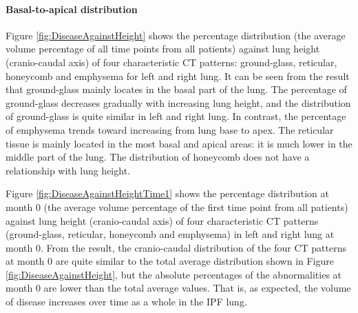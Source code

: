 \paragraph{Basal-to-apical distribution}
Figure \ref{fig:DiseaseAgainstHeight} shows the percentage distribution (the average volume percentage of all time points from all patients) against lung height (cranio-caudal axis) of four characteristic CT patterns: ground-glass, reticular, honeycomb and emphysema for left and right lung. It can be seen from the result that ground-glass mainly locates in the basal part of the lung. The percentage of ground-glass decreases gradually with increasing lung height, and the distribution of ground-glass is quite similar in left and right lung. In contrast, the percentage of emphysema trends toward increasing from lung base to apex. The reticular tissue is mainly located in the most basal and apical areas: it is much lower in the middle part of the lung. The distribution of honeycomb does not have a relationship with lung height.

Figure \ref{fig:DiseaseAgainstHeightTime1} shows the percentage distribution at month 0 (the average volume percentage of the first time point from all patients) against lung height (cranio-caudal axis) of four characteristic CT patterns (ground-glass, reticular, honeycomb and emphysema) in left and right lung at month 0. From the result, the cranio-caudal distribution of the four CT patterns at month 0 are quite similar to the total average distribution shown in Figure \ref{fig:DiseaseAgainstHeight}, but the absolute percentages of the abnormalities at month 0 are lower than the total average values. That is, as expected, the volume of disease increases over time as a whole in the IPF lung. 
\newpage

